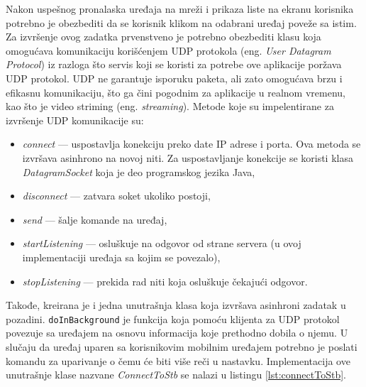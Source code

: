 \documentclass[struktura.tex]{subfiles}
\begin{document}
Nakon uspešnog pronalaska uređaja na mreži i prikaza liste na ekranu korisnika potrebno je obezbediti da se korisnik klikom na odabrani uređaj poveže sa istim. Za izvršenje ovog zadatka prvenstveno je potrebno obezbediti klasu koja omogućava komunikaciju korišćenjem UDP protokola (eng. \textit{User Datagram Protocol}) iz razloga što servis koji se koristi za potrebe ove aplikacije poržava UDP protokol. UDP ne garantuje isporuku paketa, ali zato omogućava brzu i efikasnu komunikaciju, što ga čini pogodnim za aplikacije u realnom vremenu, kao što je video striming (eng. \textit{streaming}). Metode koje su impelentirane za izvršenje UDP komunikacije su:
\begin{itemize}
    \item \textit{connect} --- uspostavlja konekciju preko date IP adrese i porta. Ova metoda se izvršava asinhrono na novoj niti. Za uspostavljanje konekcije se koristi klasa \textit{DatagramSocket} koja je deo programskog jezika Java, 
    \item \textit{disconnect} --- zatvara soket ukoliko postoji,
    \item \textit{send} --- šalje komande na uređaj,
    \item \textit{startListening} --- osluškuje na odgovor od strane servera (u ovoj implementaciji uređaja sa kojim se povezalo),
    \item \textit{stopListening} --- prekida rad niti koja osluškuje čekajući odgovor.
    
\end{itemize}


Takođe, kreirana je i jedna unutrašnja klasa koja izvršava asinhroni zadatak u pozadini. \verb|doInBackground| je funkcija koja pomoću klijenta za UDP protokol povezuje sa uređajem na osnovu informacija koje prethodno dobila o njemu. U slučaju da uređaj uparen sa korisnikovim mobilnim uređajem potrebno je poslati komandu za uparivanje o čemu će biti više reči u nastavku. Implementacija ove unutrašnje klase nazvane \textit{ConnectToStb} se nalazi u listingu \ref{lst:connectToStb}.


\end{document}
